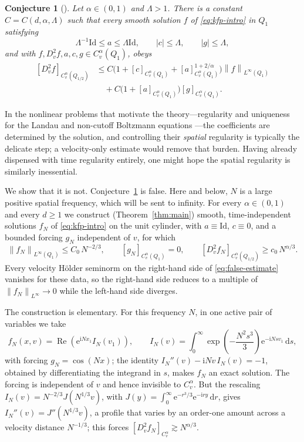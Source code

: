 \documentclass[11pt,reqno]{amsart}
\numberwithin{equation}{section}
\newtheorem{conjecture}[theorem]{Conjecture}
\theoremstyle{remark}
\newcommand{\Id}{\mathrm{Id}}
\newcommand{\ii}{\mathrm{i}}
\newcommand{\e}{\mathrm{e}}
\newcommand{\dd}{\,\mathrm{d}}
\newcommand{\norm}[1]{\left\|#1\right\|}
\begin{document}
\begin{conjecture}[{\cite[Conjecture~1.3]{HW}}]\label{conj:false}
Let $\alpha\in(0,1)$ and $\Lambda>1$.  There is a constant
$C=C(d,\alpha,\Lambda)$ such that every smooth solution $f$ of
\eqref{eq:kfp-intro} in $Q_1$ satisfying
\[
   \Lambda^{-1}\Id\le a\le\Lambda\Id,
   \qquad |c|\le\Lambda,
   \qquad |g|\le\Lambda,
\]
and with \(f,D_v^2f,a,c,g\in C_v^\alpha(Q_1)\), obeys
\begin{equation}\label{eq:false-estimate}
\begin{aligned}
   [D_v^2f]_{C_v^\alpha(Q_{1/2})}
   &\le C\Big(1+[c]_{C_v^\alpha(Q_1)}+[a]_{C_v^\alpha(Q_1)}^{1+2/\alpha}\Big)
        \norm{f}_{L^\infty(Q_1)} \\
   &\quad +C\Big(1+[a]_{C_v^\alpha(Q_1)}\Big)[g]_{C_v^\alpha(Q_1)}.
\end{aligned}
\end{equation}
\end{conjecture}
In the nonlinear problems that motivate the theory---regularity and uniqueness for the Landau and non-cutoff Boltzmann equations \cite{ImbertSilvestreBoltzmann,Silvestre17,Fournier}---the coefficients are determined by the solution, and controlling their \emph{spatial} regularity is typically the delicate step; a velocity-only estimate would remove that burden.  Having already dispensed with time regularity entirely, one might hope the spatial regularity is similarly inessential.

We show that it is not.  Conjecture~\ref{conj:false} is false.  Here and below, $N$ is a large positive spatial frequency, which will be sent to infinity.  For every $\alpha\in(0,1)$ and every $d\ge1$ we construct (Theorem~\ref{thm:main}) smooth, time-independent solutions $f_N$ of \eqref{eq:kfp-intro} on the unit cylinder, with $a\equiv\Id$, $c\equiv0$, and a bounded forcing $g_N$ independent of $v$, for which
\[
   \norm{f_N}_{L^\infty(Q_1)}\le C_0\,N^{-2/3},
   \qquad [g_N]_{C_v^\alpha(Q_1)}=0,
   \qquad [D_v^2 f_N]_{C_v^\alpha(Q_{1/2})}\ge c_0\,N^{\alpha/3}.
\]
Every velocity H\"older seminorm on the right-hand side of \eqref{eq:false-estimate} vanishes for these data, so the right-hand side reduces to a multiple of $\norm{f_N}_{L^\infty}\to0$ while the left-hand side diverges.

The construction is elementary.  For this frequency $N$, in one active pair of variables we take
\[
   f_N(x,v)=\operatorname{Re}\!\left(\e^{\ii Nx_1}I_N(v_1)\right),
   \qquad
   I_N(v)=\int_0^\infty\exp\!\left(-\frac{N^2 s^3}{3}\right)\e^{-\ii N s v_1}\dd s,
\]
with forcing $g_N=\cos(Nx)$; the identity $I_N''(v)-\ii N v\,I_N(v)=-1$, obtained by differentiating the integrand in $s$, makes $f_N$ an exact solution.  The forcing is independent of $v$ and hence invisible to $C_v^\alpha$.  But the rescaling $I_N(v)=N^{-2/3}J(N^{1/3}v)$, with $J(y)=\int_0^\infty\e^{-r^3/3}\e^{-\ii ry}\dd r$, gives $I_N''(v)=J''(N^{1/3}v)$, a profile that varies by an order-one amount across a velocity distance $N^{-1/3}$; this forces $[D_v^2 f_N]_{C_v^\alpha}\gtrsim N^{\alpha/3}$.
\end{document}
